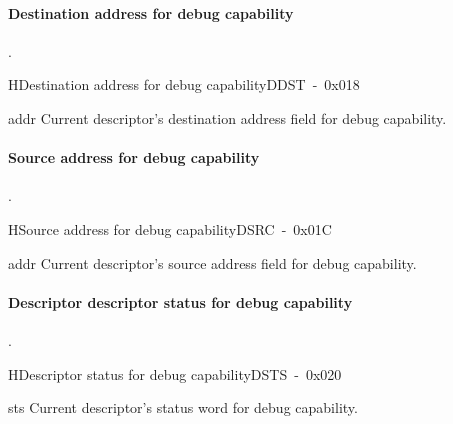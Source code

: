 \newpage
\paragraph{Destination address for debug capability}.\\

\begin{register}{H}{Destination address for debug capability}{DDST~-~0x018}
    \label{reg_ddst}%
    \regnewline%
    \begin{regdesc}\begin{reglist}
        \item [addr]Current descriptor’s destination address field for debug capability.
\end{reglist}\end{regdesc}\end{register}


\paragraph{Source address for debug capability}.\\

\begin{register}{H}{Source address for debug capability}{DSRC~-~0x01C}
    \label{reg_dsrc}%
    \regnewline%
    \begin{regdesc}\begin{reglist}
        \item [addr]Current descriptor’s source address field for debug capability.
\end{reglist}\end{regdesc}\end{register}


\paragraph{Descriptor descriptor status for debug capability}.\\

\begin{register}{H}{Descriptor status for debug capability}{DSTS~-~0x020}
    \label{reg_dsts}%
    \regnewline%
    \begin{regdesc}\begin{reglist}
        \item [sts]Current descriptor’s status word for debug capability.
\end{reglist}\end{regdesc}\end{register}


